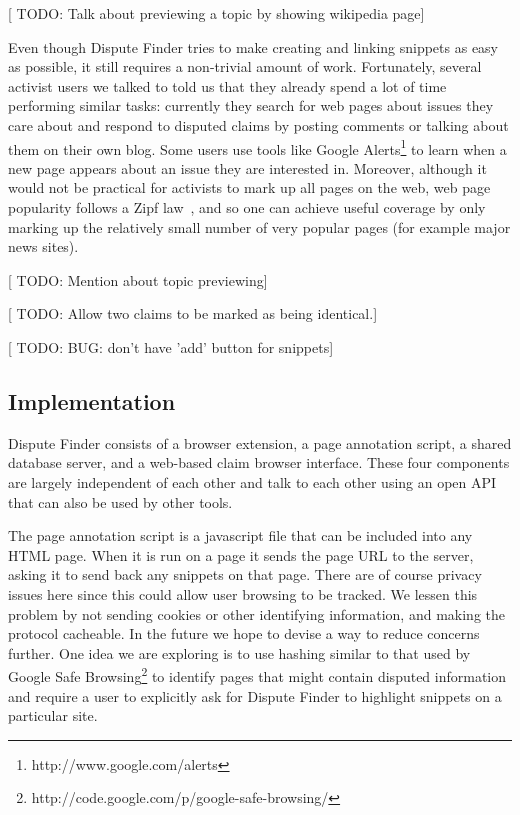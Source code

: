 \documentclass{www2010-submission}
\newcommand{\todo}[1]{{[\color{blue} TODO: #1]}}
\begin{document}
\todo{Talk about previewing a topic by showing wikipedia page}

Even though Dispute Finder tries to make creating and linking snippets as easy as possible, it still requires a non-trivial amount of work. Fortunately, several activist users we talked to told us that they already spend a lot of time performing similar tasks: currently they search for web pages about issues they care about and respond to disputed claims by posting comments or talking about them on their own blog. Some users use tools like Google Alerts\footnote{http://www.google.com/alerts} to learn when a new page appears about an issue they are interested in. Moreover, although it would not be practical for activists to mark up all pages on the web, web page popularity follows a Zipf law~\cite{Krashakov2006}, and so one can achieve useful coverage by only marking up the relatively small number of very popular pages (for example major news sites).

\todo{Mention about topic previewing}

\todo{Allow two claims to be marked as being identical.}

\todo{BUG: don't have 'add' button for snippets}


\subsection{Implementation}

Dispute Finder consists of a browser extension, a page annotation script, a shared database server, and a web-based claim browser interface. These four components are largely independent of each other and talk to each other using an open API that can also be used by other tools. 

The page annotation script is a javascript file that can be included into any HTML page. When it is run on a page it sends the page URL to the server, asking it to send back any snippets on that page. There are of course privacy issues here since this could allow user browsing to be tracked. We lessen this problem by not sending cookies or other identifying information, and making the protocol cacheable. 
In the future we hope to devise a way to reduce concerns further. 
One idea we are exploring is to use hashing similar to that used by Google Safe Browsing\footnote{http://code.google.com/p/google-safe-browsing/} to identify pages that might contain disputed information and require a user to explicitly ask for Dispute Finder to highlight snippets on a particular site.
\end{document}
